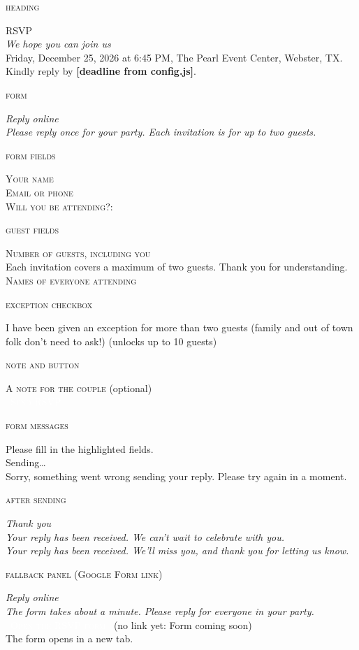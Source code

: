 \documentclass[11pt]{article}
\newcommand{\lbl}[1]{{\footnotesize\color{gold}\textsc{#1}}\par}
\newcommand{\rsvphead}[4]{\lbl{heading}\textsc{\small #1}\\ {\LARGE\itshape #2}\\ #3\\ #4 \textbf{[deadline from config.js]}.\par\medskip}
\newcommand{\rsvpform}[2]{\lbl{form}{\large\itshape #1}\\ {\color{muted}\itshape #2}\par\medskip}
\newcommand{\formfields}[5]{\lbl{form fields}\textsc{\small #1}\\ \textsc{\small #2}\\ \textsc{\small #3}: \fbox{\textsc{\small #4}} \fbox{\textsc{\small #5}}\par\medskip}
\newcommand{\formexception}[2]{\lbl{exception checkbox}[\,\,] #1 {\small\color{muted}(unlocks up to #2 guests)}\par\medskip}
\newcommand{\formguests}[3]{\lbl{guest fields}\textsc{\small #1}\\ {\small\color{muted}#2}\\ \textsc{\small #3}\par\medskip}
\newcommand{\formnote}[3]{\lbl{note and button}\textsc{\small #1} {\small\color{muted}#2}\\ \colorbox{lapis}{\textcolor{white}{\textsc{\ #3\ }}}\par\medskip}
\newcommand{\formmessages}[3]{\lbl{form messages}{\small #1}\\ {\small #2}\\ {\small #3}\par\medskip}
\newcommand{\thankyou}[3]{\lbl{after sending}{\large\itshape #1}\\ {\color{muted}\itshape #2}\\ {\color{muted}\itshape #3}\par\medskip}
\newcommand{\rsvpfallback}[5]{\lbl{fallback panel (Google Form link)}{\large\itshape #1}\\ {\color{muted}\itshape #2}\\ \colorbox{lapis}{\textcolor{white}{\textsc{\ #3\ }}} {\color{muted}\small(no link yet: #4)}\\ {\small #5}\par\medskip}
\begin{document}
\rsvphead{RSVP}{We hope you can join us}{Friday, December 25, 2026 at 6:45 PM, The Pearl Event Center, Webster, TX.}{Kindly reply by}
\rsvpform{Reply online}{Please reply once for your party. Each invitation is for up to two guests.}
\formfields{Your name}{Email or phone}{Will you be attending?}{Yes!}{No :$($}
\formguests{Number of guests, including you}{Each invitation covers a maximum of two guests. Thank you for understanding.}{Names of everyone attending}
\formexception{I have been given an exception for more than two guests (family and out of town folk don't need to ask!)}{10}
\formnote{A note for the couple}{(optional)}{Send RSVP}
\formmessages{Please fill in the highlighted fields.}{Sending…}{Sorry, something went wrong sending your reply. Please try again in a moment.}
\thankyou{Thank you}{Your reply has been received. We can't wait to celebrate with you.}{Your reply has been received. We'll miss you, and thank you for letting us know.}
\rsvpfallback{Reply online}{The form takes about a minute. Please reply for everyone in your party.}{Open the RSVP form}{Form coming soon}{The form opens in a new tab.}
\end{document}
